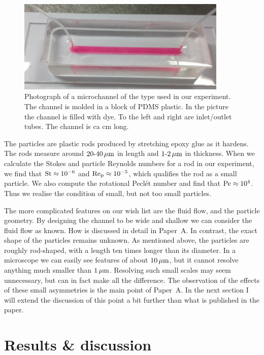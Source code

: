\documentclass[thesis.tex]{subfiles}
\begin{document}
\begin{figure}
\includegraphics[width=10cm]{figs/expsetup_lores.png}%
\caption{\label{fig:exp_setup} Photograph of a microchannel of the type used in our experiment. The channel is molded in a block of PDMS plastic. In the picture the channel is filled with dye. To the left and right are inlet/outlet tubes. The channel is ca \unit[5]{cm} long.}%
\end{figure}

The particles are plastic rods produced by stretching epoxy glue as it hardens. The rods measure around $\unit[20\textrm{-}40]{\mu m}$ in length and $\unit[1\textrm{-}2]{\mu m}$ in thickness. When we calculate the Stokes and particle Reynolds numbers for a rod in our experiment, we find that $\mbox{St} \approx 10^{-6}$ and $\mbox{Re}_{\mathrm p} \approx 10^{-5}$, which qualifies the rod as a small particle. We also compute the rotational Pecl\'et number and find that $\mbox{Pe}\approx10^{4}$. Thus we realise the condition of small, but not too small particles. 

The more complicated features on our wish list are the fluid flow, and the particle geometry. By designing the channel to be wide and shallow we can consider the fluid flow as known. How is discussed in detail in Paper~A. In contrast, the exact shape of the particles remains unknown. As mentioned above, the particles are roughly rod-shaped, with a length ten times longer than its diameter. In a microscope we can easily see features of about $\unit[10]{\mu m}$, but it cannot resolve anything much smaller than $\unit[1]{\mu m}$. Resolving such small scales may seem unnecessary, but can in fact make all the difference. The observation of the effects of these small asymmetries is the main point of Paper~A. In the next section I will extend the discussion of this point a bit further than what is published in the paper.

\section{Results \& discussion}
\end{document}

